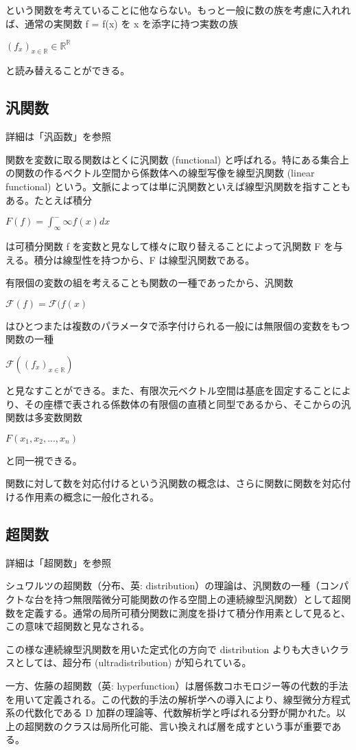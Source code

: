 \documentclass[a4j,12pt]{jreport}
\begin{document}
という関数を考えていることに他ならない。もっと一般に数の族を考慮に入れれば、通常の実関数 f = f(x) を x を添字に持つ実数の族

$(f_x)_{x \in \mathbb{R}} \in \mathbb{R}^\mathbb{R}$

と読み替えることができる。

\subsection{汎関数}
	詳細は「汎函数」を参照

関数を変数に取る関数はとくに汎関数 (functional) と呼ばれる。特にある集合上の関数の作るベクトル空間から係数体への線型写像を線型汎関数 (linear functional) という。文脈によっては単に汎関数といえば線型汎関数を指すこともある。たとえば積分

$F(f) = \int_\infty^-\infty f(x)dx$

は可積分関数 f を変数と見なして様々に取り替えることによって汎関数 F を与える。積分は線型性を持つから、F は線型汎関数である。

有限個の変数の組を考えることも関数の一種であったから、汎関数

$\mathcal{F}(f) = \mathcal{F}(f(x)$

はひとつまたは複数のパラメータで添字付けられる一般には無限個の変数をもつ関数の一種

$\mathcal{F} ((f_x)_{x \in \mathbb{R}})$

と見なすことができる。また、有限次元ベクトル空間は基底を固定することにより、その座標で表される係数体の有限個の直積と同型であるから、そこからの汎関数は多変数関数

$F(x_1,x_2,...,x_n)$

と同一視できる。

関数に対して数を対応付けるという汎関数の概念は、さらに関数に関数を対応付ける作用素の概念に一般化される。


\subsection{超関数}
	詳細は「超関数」を参照

シュワルツの超関数（分布、英: distribution）の理論は、汎関数の一種（コンパクトな台を持つ無限階微分可能関数の作る空間上の連続線型汎関数）として超関数を定義する。通常の局所可積分関数に測度を掛けて積分作用素として見ると、この意味で超関数と見なされる。

この様な連続線型汎関数を用いた定式化の方向で distribution よりも大きいクラスとしては、超分布 (ultradistribution) が知られている。

一方、佐藤の超関数（英: hyperfunction）は層係数コホモロジー等の代数的手法を用いて定義される。この代数的手法の解析学への導入により、線型微分方程式系の代数化である D 加群の理論等、代数解析学と呼ばれる分野が開かれた。以上の超関数のクラスは局所化可能、言い換えれば層を成すという事が重要である。
\end{document}
